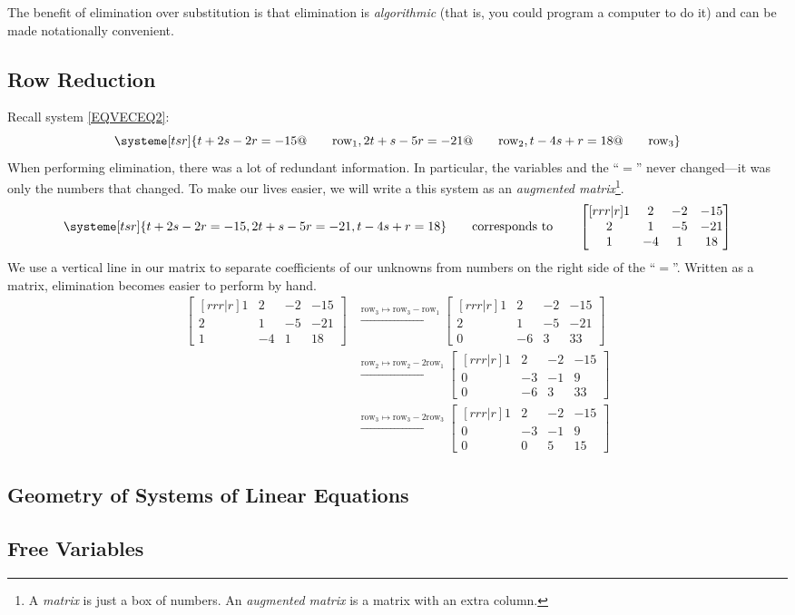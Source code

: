 	The benefit of elimination over substitution is that elimination
	is \emph{algorithmic} (that is, you could program a computer to do it)
	and can be made notationally convenient.

\subsection{Row Reduction}
	Recall system \eqref{EQVECEQ2}:
	\[
		\systeme[tsr]{
			t+2s-2r=-15@\qquad\text{row}_1,
			2t+s-5r=-21@\qquad\text{row}_2,
			t-4s+r=18@\qquad\text{row}_3
		}
	\]
	When performing elimination, there was a lot of redundant information. 
	In particular, the variables and the ``$=$'' never changed---it was
	only the numbers that changed. To make our lives easier, we will
	write a this system as an \emph{augmented matrix}\footnote{
	A \emph{matrix} is just a box of numbers. An \emph{augmented matrix} is a matrix
	with an extra column.
	}.
	\[
		\systeme[tsr]{
			t+2s-2r=-15,
			2t+s-5r=-21,
			t-4s+r=18
		}\qquad\text{corresponds to}\qquad
		\begin{bmatrix}[rrr|r]
			1&2&-2 & -15\\
			2&1&-5&-21\\
			1&-4&1&18
		\end{bmatrix}
	\]
	We use a vertical line in our matrix to separate coefficients of our unknowns
	from numbers on the right side of the ``$=$''. Written as a matrix, elimination
	becomes easier to perform by hand.
	\begin{align*}
		\begin{bmatrix}[rrr|r]
			1&2&-2 & -15\\
			2&1&-5&-21\\
			1&-4&1&18
		\end{bmatrix}
		&\xrightarrow{\text{row}_3\mapsto\text{row}_3-\text{row}_1}
		\begin{bmatrix}[rrr|r]
			1&2&-2 & -15\\
			2&1&-5&-21\\
			0&-6&3&33
		\end{bmatrix}\\
		&\xrightarrow{\text{row}_2\mapsto\text{row}_2-2\text{row}_1}
		\begin{bmatrix}[rrr|r]
			1&2&-2 & -15\\
			0&-3&-1&9\\
			0&-6&3&33
		\end{bmatrix}\\
		&\xrightarrow{\text{row}_3\mapsto\text{row}_3-2\text{row}_3}
		\begin{bmatrix}[rrr|r]
			1&2&-2 & -15\\
			0&-3&-1&9\\
			0&0&5&15
		\end{bmatrix}
	\end{align*}

	
\subsection{Geometry of Systems of Linear Equations}
\subsection{Free Variables}
